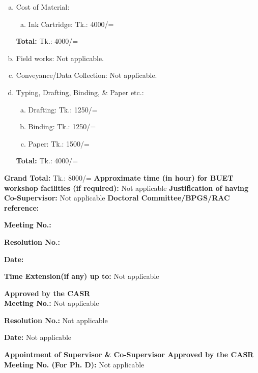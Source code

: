 \documentclass[12pt,addpoints,fleqn]{exam}
\begin{document}
\begin{questions}
\begin{enumerate}[(a)]
\item Cost of Material:
\begin{enumerate}[a.]
\item Ink Cartridge: Tk.: 4000/=
\end{enumerate}
\textbf{Total:} Tk.: 4000/=
\item Field works: Not applicable.
\item Conveyance/Data Collection: Not applicable.
\item Typing, Drafting, Binding, \& Paper etc.:
\begin{enumerate}[a.]
\item Drafting: Tk.: 1250/=
\item Binding: Tk.: 1250/=
\item Paper: Tk.: 1500/=
\end{enumerate}
\textbf{Total:} Tk.: 4000/=
\end{enumerate}
\textbf{Grand Total:} Tk.: 8000/=
{\bfseries \question
\textbf{Approximate time (in hour) for BUET workshop facilities (if required):}} Not applicable
{\bfseries \question
\textbf{Justification of having Co-Supervisor:}} Not applicable
{\bfseries \question
\textbf{Doctoral Committee/BPGS/RAC reference:}}\\
\begin{minipage}[t]{0.3\textwidth}
\textbf{Meeting No.: }
\end{minipage}
\begin{minipage}[t]{0.3\textwidth}
\textbf{Resolution No.: }
\end{minipage}
\begin{minipage}[t]{0.3\textwidth}
\textbf{Date:}
\end{minipage}
\iffalse
\begin{minipage}[t]{0.3\textwidth}
\textbf{}
\end{minipage}
\fi
{\bfseries \question
\textbf{Time Extension(if any) up to:}} Not applicable\\
\begin{minipage}[t]{0.3\textwidth}
\textbf{Approved by the CASR\\Meeting No.: }Not applicable
\end{minipage}
\begin{minipage}[t]{0.3\textwidth}
\textbf{Resolution No.: }Not applicable
\end{minipage}
\begin{minipage}[t]{0.3\textwidth}
\textbf{Date:} Not applicable
\end{minipage}
{\bfseries \question
\textbf{Appointment of Supervisor \& Co-Supervisor Approved by the CASR Meeting No. (For Ph. D):}} Not applicable\\

\end{questions}
\end{document}
